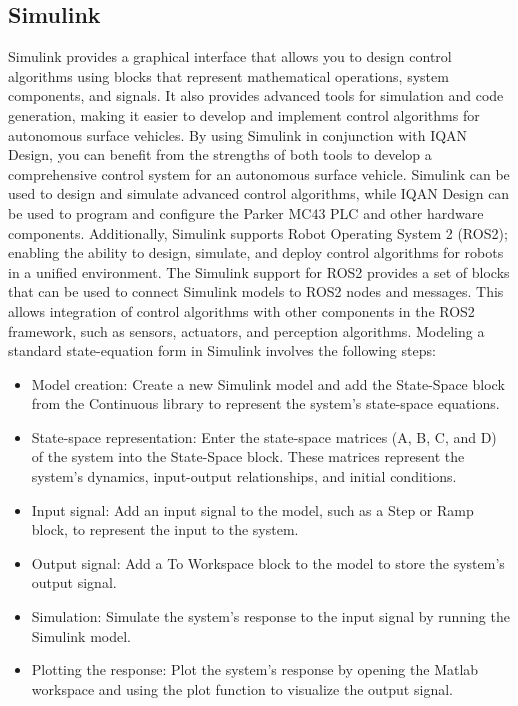 \documentclass{article}
\begin{document}
\subsection{Simulink}
Simulink provides a graphical interface that allows you to design control algorithms using blocks that represent mathematical operations, system components, and signals. It also provides advanced tools for simulation and code generation, making it easier to develop and implement control algorithms for autonomous surface vehicles. By using Simulink in conjunction with IQAN Design, you can benefit from the strengths of both tools to develop a comprehensive control system for an autonomous surface vehicle. Simulink can be used to design and simulate advanced control algorithms, while IQAN Design can be used to program and configure the Parker MC43 PLC and other hardware components. Additionally, Simulink supports Robot Operating System 2 (ROS2); enabling the ability to design, simulate, and deploy control algorithms for robots in a unified environment. The Simulink support for ROS2 provides a set of blocks that can be used to connect Simulink models to ROS2 nodes and messages. This allows integration of control algorithms with other components in the ROS2 framework, such as sensors, actuators, and perception algorithms. Modeling a standard state-equation form in Simulink involves the following steps:
\begin{itemize}
    \item Model creation: Create a new Simulink model and add the State-Space block from the Continuous library to represent the system's state-space equations.
    \item State-space representation: Enter the state-space matrices (A, B, C, and D) of the system into the State-Space block. These matrices represent the system's dynamics, input-output relationships, and initial conditions.
    \item Input signal: Add an input signal to the model, such as a Step or Ramp block, to represent the input to the system.
    \item Output signal: Add a To Workspace block to the model to store the system's output signal.
    \item Simulation: Simulate the system's response to the input signal by running the Simulink model.
    \item Plotting the response: Plot the system's response by opening the Matlab workspace and using the plot function to visualize the output signal.
\end{itemize}
\end{document}
